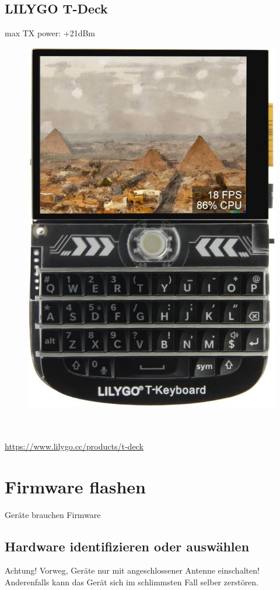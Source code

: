 \documentclass[12pt,a4paper]{article}
\begin{document}
\subsection{LILYGO T-Deck}
max TX power: +21dBm\\
\begin{figure}[h]
	\includegraphics[scale=0.1]{t-deck.jpg}
\end{figure}\\ \\
\url{https://www.lilygo.cc/products/t-deck}\\

\section{Firmware flashen}
Geräte brauchen Firmware

\subsection{Hardware identifizieren oder auswählen}
Achtung!
Vorweg, Geräte nur mit angeschlossener Antenne einschalten! Anderenfalls kann das Gerät sich im schlimmsten Fall selber zerstören.
\end{document}
